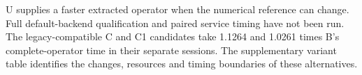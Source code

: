 U supplies a faster extracted operator when the numerical reference can change. Full default-backend qualification and paired service timing have not been run. The legacy-compatible C and C1 candidates take 1.1264 and 1.0261 times B's complete-operator time in their separate sessions. The supplementary variant table identifies the changes, resources and timing boundaries of these alternatives.
